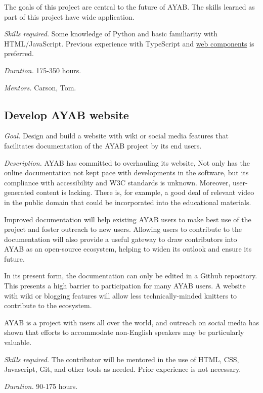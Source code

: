 \documentclass{article}
\begin{document}
The goals of this project are central to the future of AYAB. The skills learned as part of this project have wide application.

\textit{Skills required.} Some knowledge of Python and basic familiarity with HTML/JavaScript. Previous experience with TypeScript and \href{https://developer.mozilla.org/en-US/docs/Web/API/Web_components}{web components} is preferred.

\textit{Duration.} 175-350 hours. 

\textit{Mentors.} Carson, Tom.


\subsection{Develop AYAB website} 

\textit{Goal.} Design and build a website with wiki or social media features that facilitates documentation of the AYAB project by its end users. 

\textit{Description.} AYAB has committed to overhauling its website, Not only has the online documentation not kept pace with developments in the software, but its compliance with accessibility and W3C standards is unknown. Moreover, user-generated content is lacking. There is, for example, a good deal of relevant video in the public domain that could be incorporated into the educational materials.

Improved documentation will help existing AYAB users to make best use of the project and foster outreach to new users. Allowing users to contribute to the documentation will also provide a useful gateway to draw contributors into AYAB as an open-source ecosystem, helping to widen its outlook and ensure its future.

In its present form, the documentation can only be edited in a Github repository. This presents a high barrier to participation for many AYAB users. A website with wiki or blogging features will allow less technically-minded knitters to contribute to the ecosystem. 

AYAB is a project with users all over the world, and outreach on social media has shown that efforts to accommodate non-English speakers may be particularly valuable.

\textit{Skills required.} The contributor will be mentored in the use of HTML, CSS, Javascript, Git, and other tools as needed. Prior experience is not necessary.

\textit{Duration.} 90-175 hours. 
\end{document}
